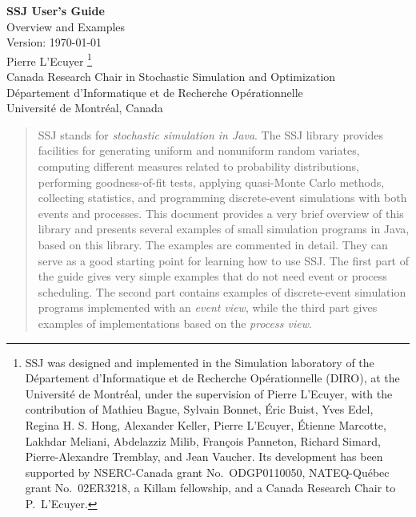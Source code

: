 \documentclass[twoside,12pt]{article}
\begin{document}
\begin{titlepage}

\null\vfill
\begin {center}
{\Large\bf SSJ User's Guide } \\[12pt] 
{\Large Overview and Examples} \\[20pt]
 Version: \today \\
\vfill
 {\sc Pierre L'Ecuyer}
\footnote {\normalsize 
 SSJ was designed and implemented in the Simulation laboratory of the
 D\'epartement d'Informa\-tique et de Recherche
 Op\'erationnelle (DIRO), at the Universit\'e de Montr\'eal,
 under the supervision of 
 Pierre L'Ecuyer, with the contribution of
 Mathieu Bague,
 Sylvain Bonnet,
 \'Eric Buist, 
 Yves Edel,
 Regina H.{} S.{} Hong, 
 Alexander Keller,
 Pierre L'Ecuyer, 
 \'Etienne Marcotte,
 Lakhdar Meliani, 
 Abdelazziz Milib, 
 Fran\c{c}ois Panneton,
 Richard Simard,
 Pierre-Alexandre Tremblay, 
 and Jean Vaucher.
%
Its development has been supported by NSERC-Canada grant No.\ ODGP0110050,
NATEQ-Qu\'ebec grant No.\ 02ER3218, a Killam fellowship,
and a Canada Research Chair to P.~L'Ecuyer.

} \\[10pt]
  Canada Research Chair in Stochastic Simulation and Optimization \\
  D\'epartement d'Informatique et de Recherche Op\'erationnelle \\
  Universit\'e de Montr\'eal, Canada
\vfill\vfill
\end {center}

\begin {quotation}
\noindent 
SSJ stands for \emph{stochastic simulation in Java}.
The SSJ library provides facilities for generating uniform and nonuniform random 
variates, computing different measures related to probability 
distributions, performing goodness-of-fit tests, applying 
quasi-Monte Carlo methods, collecting statistics,
and programming discrete-event simulations with both events and processes.
This document provides a very brief overview of this library
and presents several examples of small simulation programs in Java,
based on this library.  The examples are commented in detail.
They can serve as a good starting point for learning how to use SSJ.
The first part of the guide gives very simple examples that do not
need event or process scheduling.
The second part contains examples of discrete-event simulation 
programs implemented with an \emph{event view},
while the third part gives examples of implementations based 
on the \emph{process view}.
\end {quotation}

\vfill
\end{titlepage}
\end{document}
